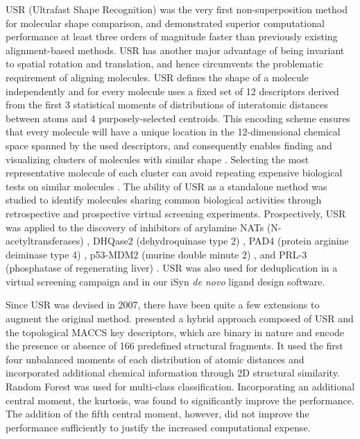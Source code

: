 USR (Ultrafast Shape Recognition) \citep{1379} was the very first non-superposition method for molecular shape comparison, and demonstrated superior computational performance at least three orders of magnitude faster than previously existing alignment-based methods. USR has another major advantage of being invariant to spatial rotation and translation, and hence circumvents the problematic requirement of aligning molecules. USR defines the shape of a molecule independently and for every molecule uses a fixed set of 12 descriptors derived from the first 3 statistical moments of distributions of interatomic distances between atoms and 4 purposely-selected centroids. This encoding scheme ensures that every molecule will have a unique location in the 12-dimensional chemical space spanned by the used descriptors, and consequently enables finding and visualizing clusters of molecules with similar shape \citep{1280,1332}. Selecting the most representative molecule of each cluster can avoid repeating expensive biological tests on similar molecules \citep{1280}. The ability of USR as a standalone method was studied to identify molecules sharing common biological activities through retrospective \citep{1332} and prospective \citep{1380,1281,1504,1502,1615} virtual screening experiments. Prospectively, USR was applied to the discovery of inhibitors of arylamine NATs (N-acetyltransferases) \citep{1380}, DHQase2 (dehydroquinase type 2) \citep{1281}, PAD4 (protein arginine deiminase type 4) \citep{1504}, p53-MDM2 (murine double minute 2) \citep{1502}, and PRL-3 (phosphatase of regenerating liver) \citep{1615}. USR was also used for deduplication in a virtual screening campaign \citep{1390} and in our iSyn \citep{1409,1387} \textit{de novo} ligand design software.

Since USR was devised in 2007, there have been quite a few extensions \citep{1333,1436,1437,1334,1335,1337,1338,1331,1407,1408} to augment the original method. \citep{1333} presented a hybrid approach composed of USR and the topological MACCS key descriptors, which are binary in nature and encode the presence or absence of 166 predefined structural fragments. It used the first four unbalanced moments of each distribution of atomic distances and incorporated additional chemical information through 2D structural similarity. Random Forest \citep{1309} was used for multi-class classification. Incorporating an additional central moment, the kurtosis, was found to significantly improve the performance. The addition of the fifth central moment, however, did not improve the performance sufficiently to justify the increased computational expense.

